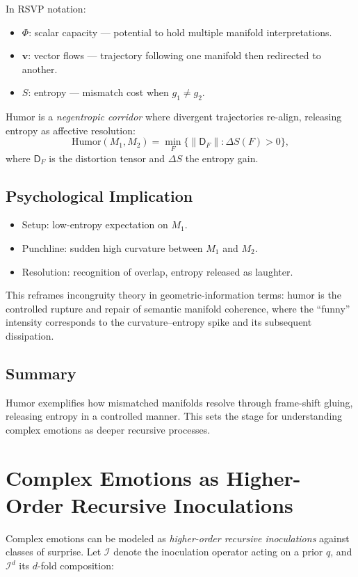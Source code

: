 \documentclass{article}
\theoremstyle{definition}
\begin{document}
In RSVP notation:
\begin{itemize}
  \item $\Phi$: scalar capacity --- potential to hold multiple manifold interpretations.
  \item $\mathbf{v}$: vector flows --- trajectory following one manifold then redirected to another.
  \item $S$: entropy --- mismatch cost when $g_1 \neq g_2$.
\end{itemize}

Humor is a \emph{negentropic corridor} where divergent trajectories re-align, releasing entropy as affective resolution:
\[
\text{Humor}(M_1,M_2) =
\min_{F} \big\{ \|\mathsf{D}_F\| : \Delta S(F) > 0 \big\},
\]
where $\mathsf{D}_F$ is the distortion tensor and $\Delta S$ the entropy gain.

\subsection{Psychological Implication}

\begin{itemize}
  \item Setup: low-entropy expectation on $M_1$.
  \item Punchline: sudden high curvature between $M_1$ and $M_2$.
  \item Resolution: recognition of overlap, entropy released as laughter.
\end{itemize}

This reframes incongruity theory in geometric-information terms: humor is the controlled rupture and repair 
of semantic manifold coherence, where the ``funny'' intensity corresponds to the curvature–entropy spike 
and its subsequent dissipation.

\subsection{Summary}

Humor exemplifies how mismatched manifolds resolve through frame-shift gluing, releasing entropy in a controlled manner. This sets the stage for understanding complex emotions as deeper recursive processes.

\section{Complex Emotions as Higher-Order Recursive Inoculations}

Complex emotions can be modeled as \emph{higher-order recursive inoculations} against classes of surprise. Let $\mathcal{I}$ denote the inoculation operator acting on a prior $q$, and $\mathcal{I}^d$ its $d$-fold composition:
\end{document}
